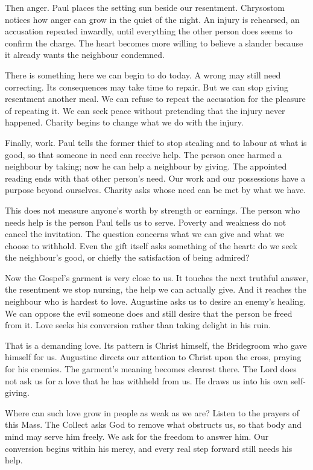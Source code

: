 Then anger. Paul places the setting sun beside our resentment. Chrysostom
notices how anger can grow in the quiet of the night. An injury is
rehearsed, an accusation repeated inwardly, until everything the other
person does seems to confirm the charge. The heart becomes more willing
to believe a slander because it already wants the neighbour condemned.

There is something here we can begin to do today. A wrong may still
need correcting. Its consequences may take time to repair. But we can
stop giving resentment another meal. We can refuse to repeat the
accusation for the pleasure of repeating it. We can seek peace without
pretending that the injury never happened. Charity begins to change
what we do with the injury.

Finally, work. Paul tells the former thief to stop stealing and to
labour at what is good, so that someone in need can receive help.
The person once harmed a neighbour by taking; now he can help a
neighbour by giving. The appointed reading ends with that other
person's need. Our work and our possessions have a purpose beyond
ourselves. Charity asks whose need can be met by what we have.

This does not measure anyone's worth by strength or earnings. The
person who needs help is the person Paul tells us to serve. Poverty
and weakness do not cancel the invitation. The question concerns
what we can give and what we choose to withhold. Even the gift
itself asks something of the heart: do we seek the neighbour's good,
or chiefly the satisfaction of being admired?

Now the Gospel's garment is very close to us. It touches the next
truthful answer, the resentment we stop nursing, the help we can
actually give. And it reaches the neighbour who is hardest to love.
Augustine asks us to desire an enemy's healing. We can oppose the
evil someone does and still desire that the person be freed from it.
Love seeks his conversion rather than taking delight in his ruin.

That is a demanding love. Its pattern is Christ himself, the
Bridegroom who gave himself for us. Augustine directs our attention
to Christ upon the cross, praying for his enemies. The garment's
meaning becomes clearest there. The Lord does not ask us for a love
that he has withheld from us. He draws us into his own self-giving.

Where can such love grow in people as weak as we are? Listen to
the prayers of this Mass. The Collect asks God to remove what
obstructs us, so that body and mind may serve him freely. We ask
for the freedom to answer him. Our conversion begins within his
mercy, and every real step forward still needs his help.

